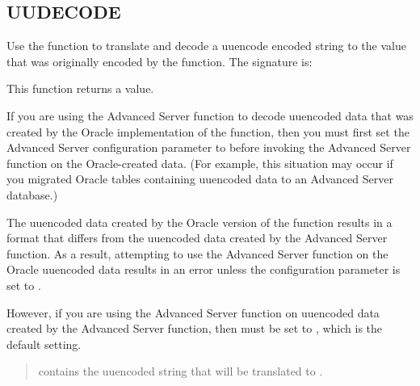 \documentclass[letterpaper,10pt,english,openany,oneside]{sphinxmanual}
\begin{document}
\subsection{UUDECODE}
\label{\detokenize{uudecode::doc}}\label{\detokenize{uudecode:uudecode}}
Use the  function to translate and decode a uuencode encoded
string to the  value that was originally encoded by the 
function. The signature is:
\begin{quote}

\end{quote}

This function returns a  value.

If you are using the Advanced Server  function to decode uuencoded data that was created by the Oracle implementation of the  function, then you must first set the Advanced Server configuration parameter  to  before invoking the Advanced Server  function on the Oracle-created data. (For example, this situation may occur if you migrated Oracle tables containing uuencoded data to an Advanced Server database.)

The uuencoded data created by the Oracle version of the 
function results in a format that differs from the uuencoded data
created by the Advanced Server  function. As a result,
attempting to use the Advanced Server  function on the Oracle
uuencoded data results in an error unless the configuration parameter
 is set to .

However, if you are using the Advanced Server  function on
uuencoded data created by the Advanced Server  function, then
 must be set to , which is the default
setting.


\begin{quote}

 contains the uuencoded string that will be translated to .
\end{quote}
\end{document}
